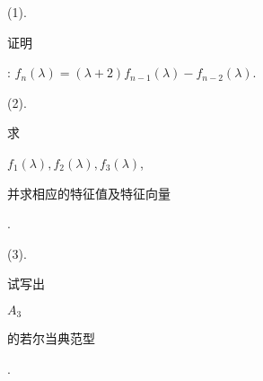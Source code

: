 \documentclass[10pt]{article}
\begin{document}
(1). \begin{CJK}{UTF8}{mj}证明\end{CJK}: $f_{n}(\lambda)=(\lambda+2) f_{n-1}(\lambda)-f_{n-2}(\lambda)$.

(2). \begin{CJK}{UTF8}{mj}求\end{CJK} $f_{1}(\lambda), f_{2}(\lambda), f_{3}(\lambda)$, \begin{CJK}{UTF8}{mj}并求相应的特征值及特征向量\end{CJK}.

(3). \begin{CJK}{UTF8}{mj}试写出\end{CJK} $A_{3}$ \begin{CJK}{UTF8}{mj}的若尔当典范型\end{CJK}.
\end{document}
